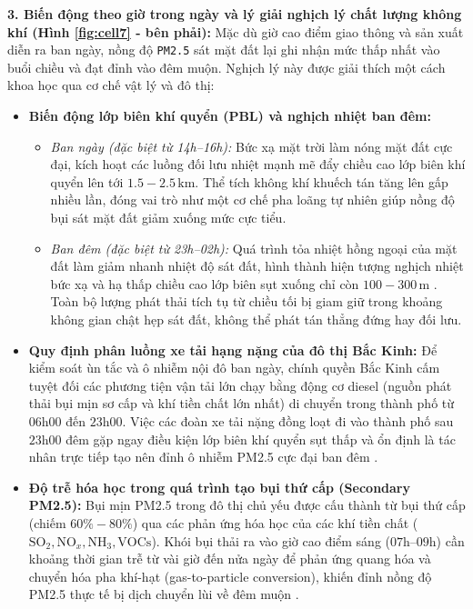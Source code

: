 \documentclass[12pt,a4paper]{article}
\begin{document}
\noindent\textbf{3. Biến động theo giờ trong ngày và lý giải nghịch lý chất lượng không khí (Hình \ref{fig:cell7} - bên phải):}
Mặc dù giờ cao điểm giao thông và sản xuất diễn ra ban ngày, nồng độ \texttt{PM2.5} sát mặt đất lại ghi nhận mức thấp nhất vào buổi chiều và đạt đỉnh vào đêm muộn. Nghịch lý này được giải thích một cách khoa học qua cơ chế vật lý và đô thị:
\begin{itemize}
    \item \textbf{Biến động lớp biên khí quyển (PBL) và nghịch nhiệt ban đêm:} 
    \begin{itemize}
        \item \textit{Ban ngày (đặc biệt từ 14h--16h):} Bức xạ mặt trời làm nóng mặt đất cực đại, kích hoạt các luồng đối lưu nhiệt mạnh mẽ đẩy chiều cao lớp biên khí quyển lên tới $1.5 - 2.5\,\text{km}$. Thể tích không khí khuếch tán tăng lên gấp nhiều lần, đóng vai trò như một cơ chế pha loãng tự nhiên giúp nồng độ bụi sát mặt đất giảm xuống mức cực tiểu.
        \item \textit{Ban đêm (đặc biệt từ 23h--02h):} Quá trình tỏa nhiệt hồng ngoại của mặt đất làm giảm nhanh nhiệt độ sát đất, hình thành hiện tượng nghịch nhiệt bức xạ và hạ thấp chiều cao lớp biên sụt xuống chỉ còn $100 - 300\,\text{m}$ \cite{gao2015}. Toàn bộ lượng phát thải tích tụ từ chiều tối bị giam giữ trong khoảng không gian chật hẹp sát đất, không thể phát tán thẳng đứng hay đối lưu.
    \end{itemize}
    \item \textbf{Quy định phân luồng xe tải hạng nặng của đô thị Bắc Kinh:} Để kiểm soát ùn tắc và ô nhiễm nội đô ban ngày, chính quyền Bắc Kinh cấm tuyệt đối các phương tiện vận tải lớn chạy bằng động cơ diesel (nguồn phát thải bụi mịn sơ cấp và khí tiền chất lớn nhất) di chuyển trong thành phố từ $06$h$00$ đến $23$h$00$. Việc các đoàn xe tải nặng đồng loạt đi vào thành phố sau $23$h$00$ đêm gặp ngay điều kiện lớp biên khí quyển sụt thấp và ổn định là tác nhân trực tiếp tạo nên đỉnh ô nhiễm PM2.5 cực đại ban đêm \cite{biggart2020}.
    \item \textbf{Độ trễ hóa học trong quá trình tạo bụi thứ cấp (Secondary PM2.5):} Bụi mịn PM2.5 trong đô thị chủ yếu được cấu thành từ bụi thứ cấp (chiếm $60\% - 80\%$) qua các phản ứng hóa học của các khí tiền chất ($\text{SO}_2, \text{NO}_x, \text{NH}_3, \text{VOCs}$). Khói bụi thải ra vào giờ cao điểm sáng ($07$h--$09$h) cần khoảng thời gian trễ từ vài giờ đến nửa ngày để phản ứng quang hóa và chuyển hóa pha khí-hạt (gas-to-particle conversion), khiến đỉnh nồng độ PM2.5 thực tế bị dịch chuyển lùi về đêm muộn \cite{seinfeld2016}.
\end{itemize}
\end{document}
